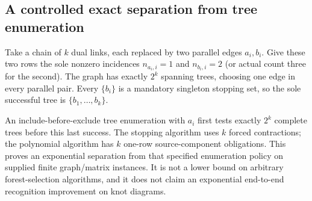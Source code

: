\subsection{A controlled exact separation from tree enumeration}

Take a chain of $k$ dual links, each replaced by two parallel edges
$a_i,b_i$.  Give these two rows the sole nonzero incidences
$n_{a_i,i}=1$ and $n_{b_i,i}=2$ (or actual count three for the second).
The graph has exactly $2^k$ spanning trees, choosing one edge in every
parallel pair.  Every $\{b_i\}$ is a mandatory singleton stopping set,
so the sole successful tree is $\{b_1,\ldots,b_k\}$.

An include-before-exclude tree enumeration with $a_i$ first tests exactly
$2^k$ complete trees before this last success.  The stopping algorithm
uses $k$ forced contractions; the polynomial algorithm has $k$ one-row
source-component obligations.  This proves an exponential separation
from that specified enumeration policy on supplied finite graph/matrix
instances.  It is not a lower bound on arbitrary forest-selection
algorithms, and it does not claim an exponential end-to-end recognition
improvement on knot diagrams.
